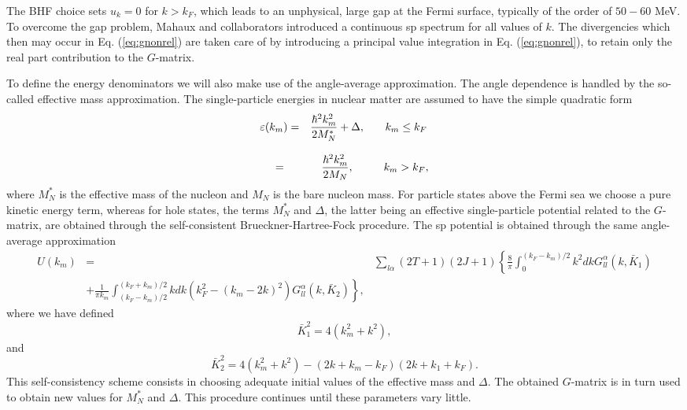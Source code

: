 \documentclass[%
oneside,                 %
final,                   %
10pt]{article}
\begin{document}
The BHF choice sets $u_k = 0$ for $k > k_F$, which leads
to an unphysical, large gap at the Fermi surface, typically
of the order of $50-60$ MeV. 
To overcome the gap
problem, Mahaux and collaborators 
introduced a continuous sp spectrum
for all values of $k$. The divergencies
which then may occur in Eq. (\ref{eq:gnonrel}) are taken care of by
introducing
a principal value integration in Eq. (\ref{eq:gnonrel}),
to retain only the
real part contribution to the $G$-matrix.


To define the energy denominators we will also make use of the
angle-average approximation.
The angle dependence is handled by the
so-called effective mass approximation. The single-particle energies
in nuclear matter are assumed to have the simple quadratic form
\begin{equation}
   \begin{array}{ccc}
   \varepsilon (k_m)=&
   {\displaystyle\frac{\hbar^{2}k_m^2}
   {2M_{N}^{*}}}+\Delta ,&\hspace{3mm}k_m\leq k_F\\
   &&\\
   =&{\displaystyle\frac{\hbar^{2}
   k_m^2}{2M_{N}}},&\hspace{3mm}k_m> k_F ,\\
   \end{array}
   \label{eq:spen}
\end{equation}
where $M_{N}^{*}$ is the effective mass of the nucleon and $M_{N}$ is the
bare nucleon mass. For particle states above the Fermi sea we choose
a pure kinetic energy term, whereas for hole states,
the terms $M_{N}^{*}$ and $\Delta$, the latter being 
an effective single-particle
potential related to the $G$-matrix, are obtained through the
self-consistent Brueckner-Hartree-Fock procedure.
The sp potential is obtained through the same angle-average approximation
\begin{align}
  \label{eq:Uav}
   U(k_m) & = & \sum_{l\alpha} (2T+1)(2J+1)
   \left \{ \frac{8}{\pi}\int_{0}^{(k_F-k_m)/2}
   k^2dk G_{ll}^{\alpha}(k,\bar{K}_1) \right.  \\
   &    \left.
    + \frac{1}{\pi k_m}\int_{(k_F-k_m)/2}^{(k_F+k_m)/2}
   kdk (k_F ^2-(k_m-2k)^2)
   G_{ll}^{\alpha}(k,\bar{K}_2)  \right \}  \nonumber,
\end{align}
where we have defined
\begin{equation}
    \bar{K}_1^2=4(k_m^2+k^2),
\end{equation}
and
\begin{equation}
    \bar{K}_2^2=4(k_m^2+k^2)-(2k+k_m-k_F)(2k+k_1+k_F).
\end{equation}
This
self-consistency scheme consists in choosing adequate initial values of the
effective mass and $\Delta$. The obtained $G$-matrix is in turn used to
obtain new values for $M_{N}^{*}$ and $\Delta$. This procedure
continues until these parameters vary little.







\printindex
\end{document}

